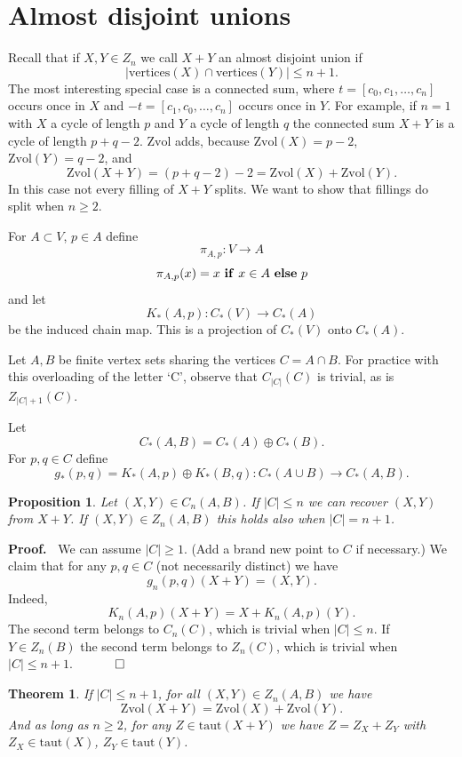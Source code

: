 \documentclass[12pt]{article}
\newtheorem{theorem}{Theorem}
\newtheorem{prop}{Proposition}
\newcommand{\proofstart}{{\noindent \bf Proof.\ }}
\newcommand{\proofend}{$\quad \qed$}
\newcommand{\kw}{\mathrm}
\newcommand{\vertices}{\kw{vertices}}
\newcommand{\taut}{\kw{taut}}
\newcommand{\Zvol}{\kw{Zvol}}
\newcommand{\kwstyle}{\bf}
\newcommand{\IF}{{\ \kwstyle{if}\ }}
\newcommand{\ELSE}{{\ \kwstyle{else}\ }}
\newcommand{\direct}{\oplus}
\begin{document}
\section{Almost disjoint unions}

Recall that if $X,Y \in Z_n$ we call $X+Y$ an almost disjoint union
if
\[
|\vertices(X) \cap \vertices(Y)| \leq n+1
.\]
The most interesting special case is a connected sum,
where $t=[c_0,c_1,\ldots,c_n]$ occurs once in $X$ and
$-t=[c_1,c_0,\ldots,c_n]$ occurs once in $Y$.
For example, if $n=1$ with $X$ a cycle of length $p$
and $Y$ a cycle of length $q$
the connected sum $X+Y$ is
a cycle of length $p+q-2$.
$\Zvol$ adds, because
$\Zvol(X)=p-2$,
$\Zvol(Y) = q-2$,
and
\[
\Zvol(X+Y) = (p+q-2)-2 = \Zvol(X)+\Zvol(Y)
.
\]
In this case not every filling of $X+Y$ splits.
We want to show that fillings do split when $n \geq 2$.

For $A \subset V$, $p \in A$ define
\[
\pi_{A,p}: V \to A
\]
\[
\pi_{A,p}(x) = x \IF x \in A \ELSE p
\]
and let
\[
K_*(A,p): C_*(V) \to C_*(A)
\]
be the induced chain map.
This is a projection of $C_*(V)$ onto $C_*(A)$.

Let $A,B$ be finite vertex sets sharing the vertices
$C = A \cap B$.
For practice with this overloading of the letter `C',
observe that $C_{|C|}(C)$ is trivial, as is $Z_{|C|+1}(C)$.

Let
\[
C_*(A,B) = C_*(A) \direct C_*(B)
.
\]
For $p,q \in C$ define
\[
g_*(p,q) = K_*(A,p) \direct K_*(B,q):
C_*(A \cup B) \to C_*(A,B)
.
\]

\begin{prop} \label{recover}
Let $(X,Y) \in C_n(A,B)$.
If $|C| \leq n$
we can recover $(X,Y)$ from $X+Y$.
If $(X,Y) \in Z_n(A,B)$ this holds also when $|C|  = n+1$.
\end{prop}

\proofstart
We can assume $|C| \geq 1$.
(Add a brand new point to $C$ if necessary.)
We claim that
for any $p,q \in C$
(not necessarily distinct) we have
\[
g_n(p,q)(X+Y)=(X,Y)
.
\]
Indeed,
\[
K_n(A,p)(X+Y) = X + K_n(A,p)(Y)
.
\]
The second term belongs to $C_n(C)$,
which is trivial when $|C| \leq n$.
If $Y \in Z_n(B)$ the second term belongs to $Z_n(C)$,
which is trivial when $|C| \leq n+1$.
\proofend


\begin{theorem} \label{th1}
If $|C| \leq n+1$,
for all $(X,Y) \in Z_n(A,B)$ we have
\[
\Zvol(X+Y) = \Zvol(X)+\Zvol(Y)
.
\]
And as long as $n \geq 2$,
for any $Z \in \taut(X+Y)$ 
we have $Z = Z_X + Z_Y$
with $Z_X \in \taut(X)$, $Z_Y \in \taut(Y)$.
\end{theorem}
\end{document}
